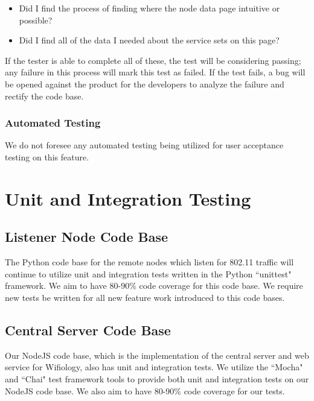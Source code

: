 \documentclass[]{article}
\begin{document}
	\begin{itemize}
	   \item Did I find the process of finding where the node data page intuitive or possible? 
	   \item Did I find all of the data I needed about the service sets on this page?
	\end{itemize}

    If the tester is able to complete all of these, the test will be considering passing; any failure in this process will
    mark this test as failed. If the test fails, a bug will be opened against the product for the developers to analyze the
    failure and rectify the code base.
	
	\subsubsection{Automated Testing}
	
	We do not foresee any automated testing being utilized for user acceptance testing on this feature.
	
	\section{Unit and Integration Testing}
	\subsection{Listener Node Code Base}
    The Python code base for the remote nodes which listen for 802.11 traffic will continue to utilize unit and 
    integration tests written in the Python ``unittest" framework. We aim to have 80-90\% code coverage for this
    code base. We require new tests be written for all new feature work introduced to this code bases.
    
    	
	\subsection{Central Server Code Base}
	Our NodeJS code base, which is the implementation of the central server and web service for Wifiology, also has unit
	and integration tests. We utilize the ``Mocha" and ``Chai" test framework tools to provide both unit and integration
	tests on our NodeJS code base. We also aim to have 80-90\% code coverage for our tests.
\end{document}
